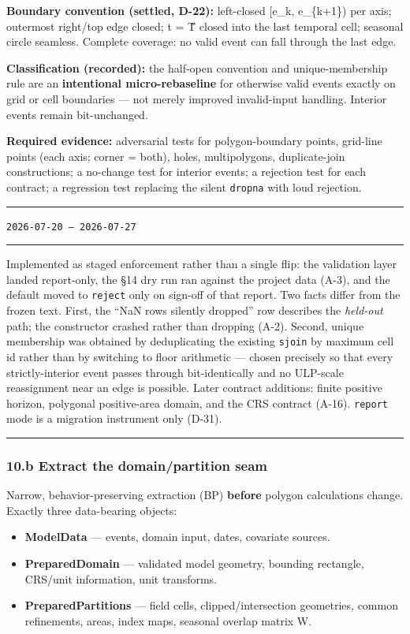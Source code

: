 \documentclass[
  10pt,
]{article}
\providecommand{\tightlist}{%
  \setlength{\itemsep}{0pt}\setlength{\parskip}{0pt}}
\newenvironment{amendment}[2]{%
  \par\medskip\noindent
  {\color{amdcolor}\rule{\linewidth}{1pt}}\par\nobreak
  \vspace{-0.45\baselineskip}
  \noindent{\color{amdcolor}\textbf{#1}}\hfill{\color{amdcolor}\small\texttt{#2}}\par\nobreak
  \vspace{-0.35\baselineskip}
  {\color{amdcolor}\rule{\linewidth}{0.4pt}}\par\nobreak\smallskip
}{%
  \par\nobreak\vspace{-0.25\baselineskip}
  {\color{amdcolor}\rule{\linewidth}{1pt}}\par\medskip
}
\begin{document}
\textbf{Boundary convention (settled, D-22):} left-closed {[}e\_k, e\_\{k+1\}) per axis; outermost right/top edge closed; t = T̃ closed into the last temporal cell; seasonal circle seamless. Complete coverage: no valid event can fall through the last edge.

\textbf{Classification (recorded):} the half-open convention and unique-membership rule are an \textbf{intentional micro-rebaseline} for otherwise valid events exactly on grid or cell boundaries --- not merely improved invalid-input handling. Interior events remain bit-unchanged.

\textbf{Required evidence:} adversarial tests for polygon-boundary points, grid-line points (each axis; corner = both), holes, multipolygons, duplicate-join constructions; a no-change test for interior events; a rejection test for each contract; a regression test replacing the silent \texttt{dropna} with loud rejection.

\begin{amendment}{A-2 --- 10.a as implemented}{2026-07-20 -- 2026-07-27}
Implemented as staged enforcement rather than a single flip: the validation layer landed report-only, the §14 dry run ran against the project data (A-3), and the default moved to \texttt{reject} only on sign-off of that report. Two facts differ from the frozen text. First, the ``NaN rows silently dropped'' row describes the \emph{held-out} path; the constructor crashed rather than dropping (A-2). Second, unique membership was obtained by deduplicating the existing \texttt{sjoin} by maximum cell id rather than by switching to floor arithmetic --- chosen precisely so that every strictly-interior event passes through bit-identically and no ULP-scale reassignment near an edge is possible. Later contract additions: finite positive horizon, polygonal positive-area domain, and the CRS contract (A-16). \texttt{report} mode is a migration instrument only (D-31).
\end{amendment}

\hypertarget{b-extract-the-domainpartition-seam}{%
\subsubsection{10.b Extract the domain/partition seam}\label{b-extract-the-domainpartition-seam}}

Narrow, behavior-preserving extraction (BP) \textbf{before} polygon calculations change. Exactly three data-bearing objects:

\begin{itemize}
\tightlist
\item
  \textbf{ModelData} --- events, domain input, dates, covariate sources.
\item
  \textbf{PreparedDomain} --- validated model geometry, bounding rectangle, CRS/unit information, unit transforms.
\item
  \textbf{PreparedPartitions} --- field cells, clipped/intersection geometries, common refinements, areas, index maps, seasonal overlap matrix W.
\end{itemize}
\end{document}
